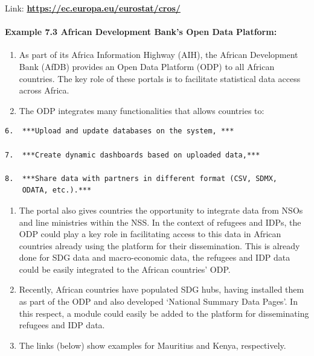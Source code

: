 \documentclass[
]{article}
\begin{document}
Link:
\href{https://ec.europa.eu/eurostat/cros/}{\textbf{https://ec.europa.eu/eurostat/cros/}}

\hypertarget{example-7.3-african-development-banks-open-data-platform-1}{%
\paragraph{Example 7.3 African Development Bank's Open Data Platform:}\label{example-7.3-african-development-banks-open-data-platform-1}}

\begin{enumerate}
\def\labelenumi{\arabic{enumi}.}
\setcounter{enumi}{499}
\item
  As part of its Africa Information Highway (AIH), the African
  Development Bank (AfDB) provides an Open Data Platform (ODP) to all
  African countries. The key role of these portals is to facilitate
  statistical data access across Africa.
\item
  The ODP integrates many functionalities that allows countries to:
\end{enumerate}

\begin{verbatim}
6.  ***Upload and update databases on the system, ***

7.  ***Create dynamic dashboards based on uploaded data,***

8.  ***Share data with partners in different format (CSV, SDMX,
    ODATA, etc.).***
\end{verbatim}

\begin{enumerate}
\def\labelenumi{\arabic{enumi}.}
\setcounter{enumi}{501}
\item
  The portal also gives countries the opportunity to integrate data
  from NSOs and line ministries within the NSS. In the context of
  refugees and IDPs, the ODP could play a key role in facilitating
  access to this data in African countries already using the platform
  for their dissemination. This is already done for SDG data and
  macro-economic data, the refugees and IDP data could be easily
  integrated to the African countries' ODP.
\item
  Recently, African countries have populated SDG hubs, having
  installed them as part of the ODP and also developed `National
  Summary Data Pages'. In this respect, a module could easily be added
  to the platform for disseminating refugees and IDP data.
\item
  The links (below) show examples for Mauritius and Kenya,
  respectively.
\end{enumerate}
\end{document}
